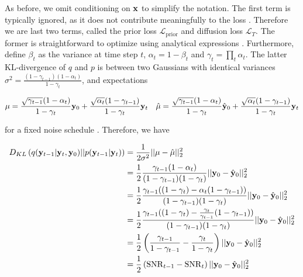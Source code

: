 As before, we omit conditioning on $\bold{x}$ to simplify the notation. The first term is typically ignored, as it does not contribute meaningfully to the loss \parencite{Ribeiro2024}. Therefore we are last two terms, called the prior loss $\mathcal{L}_{\mathrm{prior}}$ and diffusion loss $\mathcal{L}_{T}$. The former is straightforward to optimize using analytical expressions \parencite{Maggiora2023}. Furthermore, define $\beta_{t}$ as the variance at time step $t$, $\alpha_{t}=1-\beta_{t}$ and $\gamma_{t}=\prod_{t}\alpha_{t}$. The latter KL-divergence of $q$ and $p$ is between two Gaussians with identical variances $\sigma^{2} = \frac{(1-\gamma_{t-1})(1-\alpha_{t})}{1-\gamma_{t}}$, and expectations

\begin{align*}
\mu = \frac{\sqrt{\gamma_{t-1}}(1-\alpha_{t})}{1-\gamma_{t}}\bold{y}_{0}+ \frac{\sqrt{\alpha_{t}}(1-\gamma_{t-1})}{{1-\gamma_{t}}}\bold{y}_{t} \quad \hat{\mu} = \frac{\sqrt{\gamma_{t-1}}(1-\alpha_{t})}{1-\gamma_{t}}\hat{\bold{y}}_{0}+ \frac{\sqrt{\alpha_{t}}(1-\gamma_{t-1})}{{1-\gamma_{t}}}\bold{y}_{t}
\end{align*}

for a fixed noise schedule \parencite{Saharia2021}. Therefore, we have

\begin{align*}
D_{KL}\left(q(\bold{y}_{t-1}\lvert\bold{y}_t,\bold{y}_0)\lvert\lvert p(\bold{y}_{t-1}\lvert\bold{y}_t) \right) &= \frac{1}{2\sigma^{2}} \lvert\lvert \mu - \hat{\mu} \lvert\lvert_{2}^{2} \\
&= \frac{1}{2}\frac{\gamma_{t-1}(1-\alpha_{t})}{(1-\gamma_{t-1})(1-\gamma_{t})}\lvert\lvert \bold{y}_{0} - \hat{\bold{y}}_{0} \lvert\lvert_{2}^{2}\\
&= \frac{1}{2}\frac{\gamma_{t-1}((1-\gamma_{t})-\alpha_{t}(1-\gamma_{t-1}))}{(1-\gamma_{t-1})(1-\gamma_{t})}\lvert\lvert \bold{y}_{0} - \hat{\bold{y}}_{0} \lvert\lvert_{2}^{2}\\
&= \frac{1}{2}\frac{\gamma_{t-1}((1-\gamma_{t})-\frac{\gamma_{t}}{\gamma_{t-1}}(1-\gamma_{t-1}))}{(1-\gamma_{t-1})(1-\gamma_{t})}\lvert\lvert \bold{y}_{0} - \hat{\bold{y}}_{0} \lvert\lvert_{2}^{2}\\
&= \frac{1}{2}\left(\frac{\gamma_{t-1}}{1-\gamma_{t-1}}-\frac{\gamma_{t}}{1-\gamma_{t}}\right)\lvert\lvert \bold{y}_{0} - \hat{\bold{y}}_{0} \lvert\lvert_{2}^{2}\\
&= \frac{1}{2}\left(\mathrm{SNR}_{t-1}-\mathrm{SNR}_{t}\right)\lvert\lvert \bold{y}_{0} - \hat{\bold{y}}_{0} \lvert\lvert_{2}^{2}
\end{align*}


